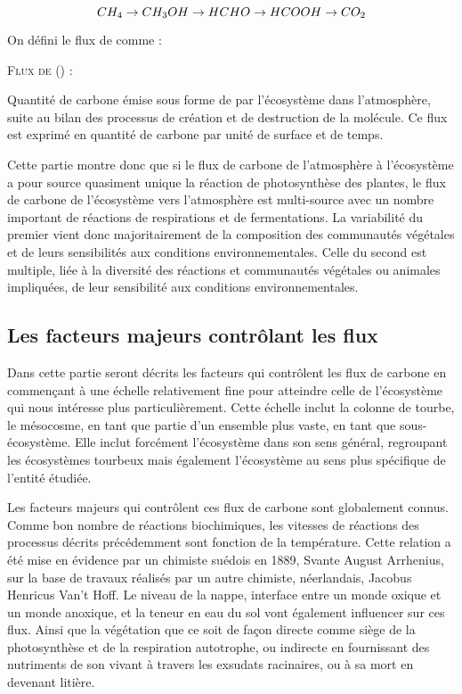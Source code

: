 $$
CH_{4} \rightarrow CH_{3}OH \rightarrow HCHO \rightarrow HCOOH \rightarrow CO_{2} \\
$$

On défini le flux de \chh comme : 
\begin{pdef}
\textsc{Flux de \chh (\fchh)} :

Quantité de carbone émise sous forme de \chh par l'écosystème dans l'atmosphère, suite au bilan des processus de création et de destruction de la molécule.
Ce flux est exprimé en quantité de carbone par unité de surface et de temps.
\end{pdef}




Cette partie montre donc que si le flux de carbone de l'atmosphère à l'écosystème a pour source quasiment unique la réaction de photosynthèse des plantes, le flux de carbone de l'écosystème vers l'atmosphère est multi-source avec un nombre important de réactions de respirations et de fermentations.
La variabilité du premier vient donc majoritairement de la composition des communautés végétales et de leurs sensibilités aux conditions environnementales.
Celle du second est multiple, liée à la diversité des réactions et communautés végétales ou animales impliquées, de leur sensibilité aux conditions environnementales.

\subsection{Les facteurs majeurs contrôlant les flux}

Dans cette partie seront décrits les facteurs qui contrôlent les flux de carbone en commençant à une échelle relativement fine pour atteindre celle de l'écosystème qui nous intéresse plus particulièrement.
Cette échelle inclut la colonne de tourbe, le mésocosme, en tant que partie d'un ensemble plus vaste, en tant que sous-écosystème. 
Elle inclut forcément l'écosystème dans son sens général, regroupant les écosystèmes tourbeux mais également l'écosystème au sens plus spécifique de l'entité étudiée.

Les facteurs majeurs qui contrôlent ces flux de carbone sont globalement connus.
Comme bon nombre de réactions biochimiques, les vitesses de réactions des processus décrits précédemment sont fonction de la température.
Cette relation  a été mise en évidence par un chimiste suédois en 1889, Svante August Arrhenius, sur la base de travaux réalisés par un autre chimiste, néerlandais, Jacobus Henricus Van't Hoff.
Le niveau de la nappe, interface entre un monde oxique et un monde anoxique, et la teneur en eau du sol vont également influencer sur ces flux.
Ainsi que la végétation  que ce soit de façon directe comme siège de la photosynthèse et de la respiration autotrophe, ou indirecte en fournissant des nutriments de son vivant à travers les exsudats racinaires, ou à sa mort en devenant litière.


